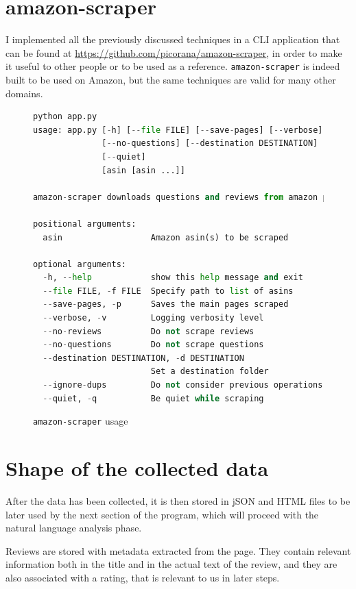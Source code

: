 \documentclass[LaM,oneside,binding=0.6cm]{sapthesis}
\begin{document}
\section{amazon-scraper}
I implemented all the previously discussed techniques in a CLI application that can be found at \url{https://github.com/picorana/amazon-scraper}, in order to make it useful to other people or to be used as a reference. \texttt{amazon-scraper} is indeed built to be used on Amazon, but the same techniques are valid for many other domains.

\begin{figure}
\centering
\begin{lstlisting}[language=python]
python app.py
usage: app.py [-h] [--file FILE] [--save-pages] [--verbose] [--no-reviews]
              [--no-questions] [--destination DESTINATION] [--ignore-dups]
              [--quiet]
              [asin [asin ...]]

amazon-scraper downloads questions and reviews from amazon products

positional arguments:
  asin                  Amazon asin(s) to be scraped

optional arguments:
  -h, --help            show this help message and exit
  --file FILE, -f FILE  Specify path to list of asins
  --save-pages, -p      Saves the main pages scraped
  --verbose, -v         Logging verbosity level
  --no-reviews          Do not scrape reviews
  --no-questions        Do not scrape questions
  --destination DESTINATION, -d DESTINATION
                        Set a destination folder
  --ignore-dups         Do not consider previous operations
  --quiet, -q           Be quiet while scraping
\end{lstlisting}
\caption{\texttt{amazon-scraper} usage}
\label{fig:amazon-scraper}
\end{figure}

\section{Shape of the collected data}

After the data has been collected, it is then stored in jSON and HTML files to be later used by the next section of the program, which will proceed with the natural language analysis phase.

Reviews are stored with metadata extracted from the page. They contain relevant information both in the title and in the actual text of the review, and they are also associated with a rating, that is relevant to us in later steps.
\end{document}
